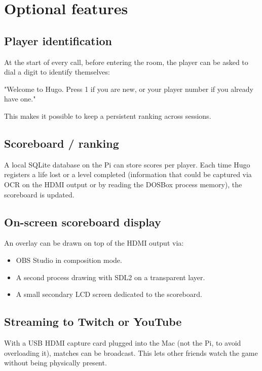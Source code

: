 \section{Optional features}

\subsection{Player identification}

At the start of every call, before entering the room, the player can be asked to dial a digit to identify themselves:

\begin{plaincode}
"Welcome to Hugo. Press 1 if you are new, or your player number
if you already have one."
\end{plaincode}

This makes it possible to keep a persistent ranking across sessions.

\subsection{Scoreboard / ranking}

A local SQLite database on the Pi can store scores per player. Each time Hugo registers a life lost or a level completed (information that could be captured via OCR on the HDMI output or by reading the DOSBox process memory), the scoreboard is updated.

\subsection{On-screen scoreboard display}

An overlay can be drawn on top of the HDMI output via:

\begin{itemize}
  \item OBS Studio in composition mode.
  \item A second process drawing with SDL2 on a transparent layer.
  \item A small secondary LCD screen dedicated to the scoreboard.
\end{itemize}

\subsection{Streaming to Twitch or YouTube}

With a USB HDMI capture card plugged into the Mac (not the Pi, to avoid overloading it), matches can be broadcast. This lets other friends watch the game without being physically present.

